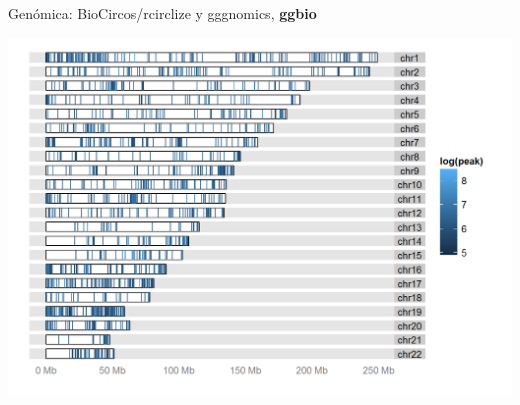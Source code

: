 \documentclass[ignorenonframetext,]{beamer}
\begin{document}
\begin{frame}{Genómica: BioCircos/rcirclize y gggnomics, \textbf{ggbio}}
\protect\hypertarget{genuxf3mica-biocircosrcirclize-y-gggnomics-ggbio-2}{}

\begin{center}\includegraphics[width=0.95\linewidth]{ggnomics_2} \end{center}

\end{frame}
\end{document}
